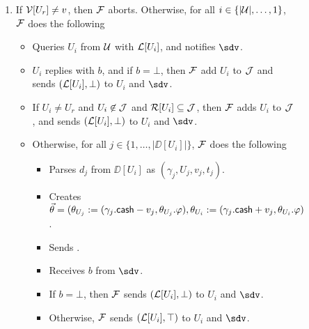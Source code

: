 \begin{figure*}[!t]
{{\begin{enumerate}
	\item If $\mathcal{V}[U_r] \neq v$, then $\mathcal{F}$ aborts. Otherwise, for all $i \in \{|\mathcal{U}|,\ldots,1\}$, 
	$\mathcal{F}$ does the following
	\begin{itemize}[label=-]
		\item Queries $U_i$ from $\mathcal{U}$ with $\mathcal{L}[U_i]$, and notifies $\sdv$.
		\item $U_i$ replies with $b$, and if $b = \bot$, then $\mathcal{F}$ add $U_i$ to $\mathcal{J}$ and sends
		$(\mathcal{L}[U_i],\bot)$ to $U_i$ and $\sdv$. 
		\item If $U_i \neq U_r$ and $U_i \not\in \mathcal{J}$ and $\mathcal{R}[U_i] \subseteq \mathcal{J}$, then $\mathcal{F}$ adds $U_i$ to $\mathcal{J}$, 
		and sends $(\mathcal{L}[U_i],\bot)$ to $U_i$ and $\sdv$.
		\item Otherwise, for all $j \in \{1,\ldots,|\DD[U_i]|\}$, $\mathcal{F}$ does the following
		\begin{itemize}[label=$\circ$]
			\item Parses $d_j$ from $\DD[U_i]$ as $(\gamma_j,U_j,v_j,t_j)$.
			\item Creates $\vec{\theta} = (\theta_{U_j} := (\gamma_j.\mathsf{cash} - v_j, \theta_{U_j}.
			\varphi), \theta_{U_i} := (\gamma_j.\mathsf{cash} + v_j, \theta_{U_i}.\varphi)$. 
			\item Sends .
			\item Receives $b$ from $\sdv$.
			\item If $b = \bot$, then $\mathcal{F}$ sends $(\mathcal{L}[U_i], \bot)$ to $U_i$ and $\sdv$.
			\item Otherwise, $\mathcal{F}$ sends $(\mathcal{L}[U_i], \top)$ to $U_i$ and $\sdv$.
		\end{itemize}
	\end{itemize}
	

\end{enumerate}}}
\end{figure*}
